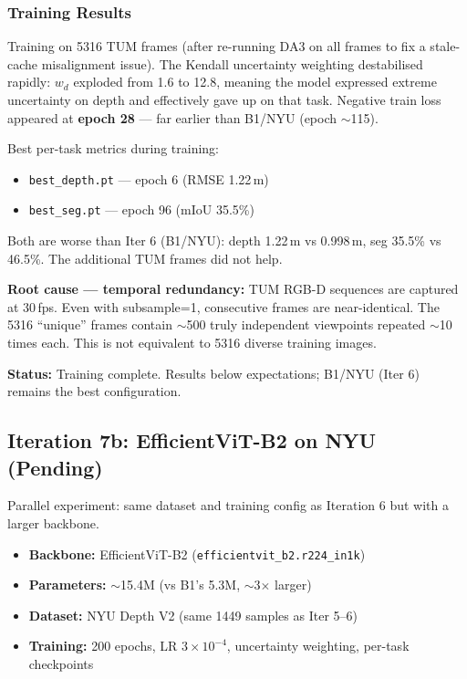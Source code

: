 \documentclass[11pt,a4paper]{article}
\begin{document}
\subsubsection{Training Results}

Training on 5316 TUM frames (after re-running DA3 on all frames to fix
a stale-cache misalignment issue). The Kendall uncertainty weighting
destabilised rapidly: $w_d$ exploded from 1.6 to 12.8, meaning the model
expressed extreme uncertainty on depth and effectively gave up on that
task. Negative train loss appeared at \textbf{epoch 28} --- far earlier
than B1/NYU (epoch $\sim$115).

Best per-task metrics during training:
\begin{itemize}[nosep]
  \item \texttt{best\_depth.pt} --- epoch 6 (RMSE 1.22\,m)
  \item \texttt{best\_seg.pt} --- epoch 96 (mIoU 35.5\%)
\end{itemize}

Both are worse than Iter 6 (B1/NYU): depth 1.22\,m vs 0.998\,m,
seg 35.5\% vs 46.5\%. The additional TUM frames did not help.

\textbf{Root cause --- temporal redundancy:} TUM RGB-D sequences are
captured at 30\,fps. Even with subsample=1, consecutive frames are
near-identical. The 5316 ``unique'' frames contain $\sim$500 truly
independent viewpoints repeated $\sim$10 times each. This is not
equivalent to 5316 diverse training images.

\textbf{Status:} Training complete. Results below expectations;
B1/NYU (Iter 6) remains the best configuration.

\subsection{Iteration 7b: EfficientViT-B2 on NYU (Pending)}

Parallel experiment: same dataset and training config as Iteration 6 but
with a larger backbone.

\begin{itemize}[nosep]
  \item \textbf{Backbone:} EfficientViT-B2 (\texttt{efficientvit\_b2.r224\_in1k})
  \item \textbf{Parameters:} $\sim$15.4M (vs B1's 5.3M, $\sim$3$\times$ larger)
  \item \textbf{Dataset:} NYU Depth V2 (same 1449 samples as Iter 5--6)
  \item \textbf{Training:} 200 epochs, LR $3 \times 10^{-4}$,
    uncertainty weighting, per-task checkpoints
\end{itemize}
\end{document}
